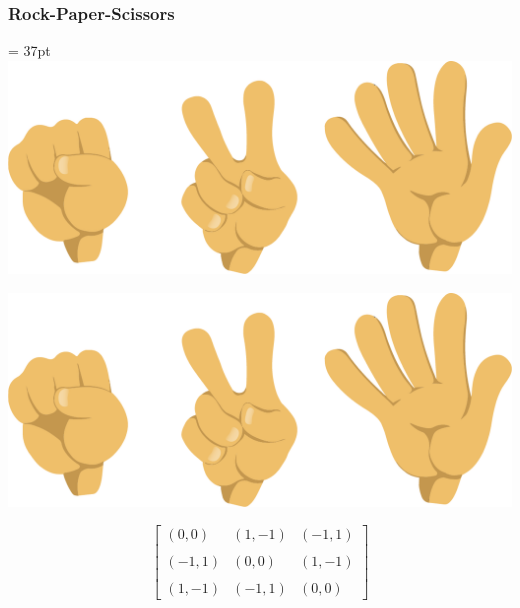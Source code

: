 \begin{frame}
    \frametitle{Rock-Paper-Scissors}

    \hfuzz = 37pt
    \hspace{3.9cm}
    \vspace{-1cm}
    \includegraphics[width=.39\textwidth]{Bin/rock-paper-scissors.png}
    \begin{multicols}{3}
        \begin{flushright}
            \includegraphics[width=.25\textwidth, angle=270]{Bin/rock-paper-scissors.png}
        \end{flushright}
            
        \columnbreak
 
        \begin{equation*}
            \begin{bmatrix}
                (0,0) & (1,-1) & (-1,1) \\
                & & \\
                (-1,1) & (0,0) & (1,-1) \\
                & & \\
                (1,-1) & (-1,1) & (0,0)
            \end{bmatrix}
        \end{equation*}

        \columnbreak
        \vfill
    \end{multicols}

\end{frame}